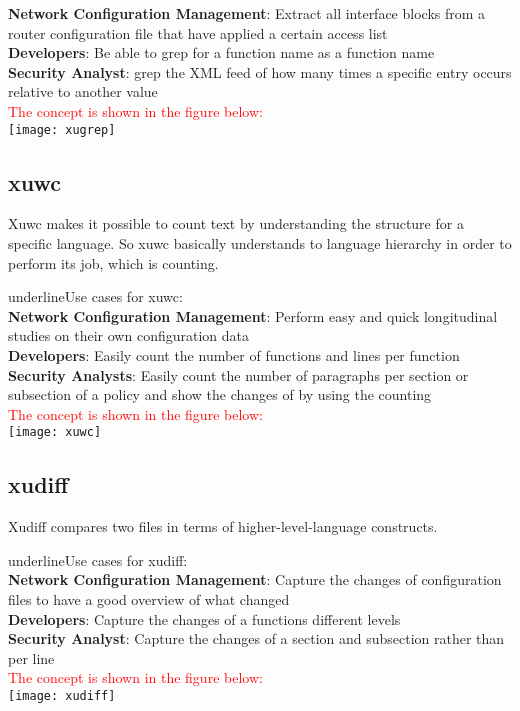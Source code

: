 \textbf{Network Configuration Management}: Extract all interface blocks from a router configuration file that have applied a certain access list\\
\textbf{Developers}: Be able to grep for a function name as a function name\\
\textbf{Security Analyst}: grep the XML feed of how many times a specific entry occurs relative to another value\\

\textcolor{red}{The concept is shown in the figure below:}\\

	\texttt{[image: xugrep]}

\subsection{xuwc}

Xuwc makes it possible to count text by understanding the structure for a specific language. So xuwc basically understands to language hierarchy in order to perform its job, which is counting.

underline{Use cases for xuwc:} \\

\textbf{Network Configuration Management}: Perform easy and quick longitudinal studies on their own configuration data\\
\textbf{Developers}: Easily count the number of functions and lines per function\\
\textbf{Security Analysts}: Easily count the number of paragraphs per section or subsection of a policy and show the changes of by using the counting\\

\textcolor{red}{The concept is shown in the figure below:}\\

       \texttt{[image: xuwc]}

\subsection{xudiff}

Xudiff compares two files in terms of higher-level-language constructs.

underline{Use cases for xudiff:} \\

\textbf{Network Configuration Management}: Capture the changes of configuration files to have a good overview of what changed\\
\textbf{Developers}: Capture the changes of a functions different levels\\
\textbf{Security Analyst}: Capture the changes of a section and subsection rather than per line\\

\textcolor{red}{The concept is shown in the figure below:}\\

	\texttt{[image: xudiff]}

